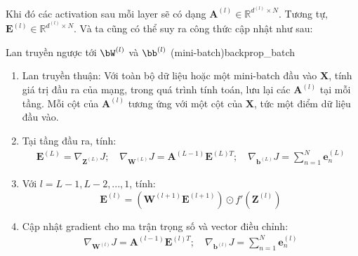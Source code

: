 Khi đó các activation sau mỗi layer sẽ có dạng $\mathbf{A}^{(l)} \in \mathbb{R}^{d^{(l)} \times N}$. Tương tự, $\mathbf{E}^{(l)} \in \mathbb{R}^{d^{(l)}\times N}$. Và ta cũng có thể suy ra công thức cập nhật như sau:

 \begin{myalg}{Lan truyền ngược tới $\bW^{(l)}$ và $\bb^{(l)}$ (mini-batch)}{backprop_batch}
\begin{enumerate}
 \item Lan truyền thuận: Với toàn bộ dữ liệu hoặc một mini-batch đầu vào
 $\mathbf{X}$, tính giá trị đầu ra của mạng, trong quá trình tính toán, lưu lại
 các $\mathbf{A}^{(l)}$ tại mỗi tầng. Mỗi cột của $\mathbf{A}^{(l)}$ tương ứng
 với một cột của $\mathbf{X}$, tức một điểm dữ liệu đầu vào.
 \item Tại tầng đầu ra, tính:
  \begin{eqnarray*} 
  \mathbf{E}^{(L)} = \nabla_{\mathbf{Z}^{(L)}}J; \quad 
 \nabla_{\mathbf{W}^{(L)}}J = 
 \mathbf{A}^{(L-1)}\mathbf{E}^{(L)T}; \quad
 \nabla_{\mathbf{b}^{(L)}}J =  \sum_{n=1}^N\mathbf{e}_n^{(L)} 
 \end{eqnarray*} 
 \item Với $l = L-1, L-2, ..., 1$, tính: 
 \begin{equation*} 
 \mathbf{E}^{(l)} = \left( \mathbf{W}^{(l+1)} \mathbf{E}^{(l+1)} \right) \odot f'(\mathbf{Z}^{(l)}) 
 \end{equation*} 

 \item Cập nhật gradient cho ma trận trọng số và vector điều chỉnh: 
 \begin{eqnarray*} 
 \nabla_{\mathbf{W}^{(l)}}J = 
 \mathbf{A}^{(l-1)}\mathbf{E}^{(l)T}; \quad 
 \nabla_{\mathbf{b}^{(l)}}J =  \sum_{n=1}^N\mathbf{e}_n^{(l)} 
 \end{eqnarray*} 
 \end{enumerate}
 \end{myalg}
 
